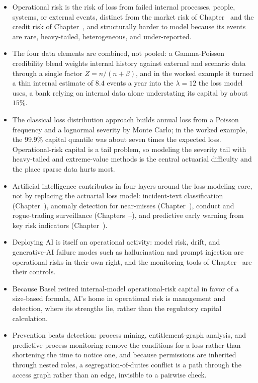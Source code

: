 \documentclass[../ai_in_finance]{subfiles}
\begin{document}

\begin{itemize}
\item Operational risk is the risk of loss from failed internal processes, people, systems, or external events, distinct from the market risk of Chapter~ and the credit risk of Chapter~, and structurally harder to model because its events are rare, heavy-tailed, heterogeneous, and under-reported.
\item The four data elements are combined, not pooled: a Gamma-Poisson credibility blend weights internal history against external and scenario data through a single factor $Z=n/(n+\beta)$, and in the worked example it turned a thin internal estimate of $8.4$ events a year into the $\lambda=12$ the loss model uses, a bank relying on internal data alone understating its capital by about $15\%$.
\item The classical loss distribution approach builds annual loss from a Poisson frequency and a lognormal severity by Monte Carlo; in the worked example, the 99.9\% capital quantile was about seven times the expected loss. Operational-risk capital is a tail problem, so modeling the severity tail with heavy-tailed and extreme-value methods is the central actuarial difficulty and the place sparse data hurts most.
\item Artificial intelligence contributes in four layers around the loss-modeling core, not by replacing the actuarial loss model: incident-text classification (Chapter~), anomaly detection for near-misses (Chapter~), conduct and rogue-trading surveillance (Chapters~--), and predictive early warning from key risk indicators (Chapter~).
\item Deploying AI is itself an operational activity: model risk, drift, and generative-AI failure modes such as hallucination and prompt injection are operational risks in their own right, and the monitoring tools of Chapter~ are their controls.
\item Because Basel retired internal-model operational-risk capital in favor of a size-based formula, AI's home in operational risk is management and detection, where its strengths lie, rather than the regulatory capital calculation.
\item Prevention beats detection: process mining, entitlement-graph analysis, and predictive process monitoring remove the conditions for a loss rather than shortening the time to notice one, and because permissions are inherited through nested roles, a segregation-of-duties conflict is a path through the access graph rather than an edge, invisible to a pairwise check.

\end{itemize}
\end{document}
